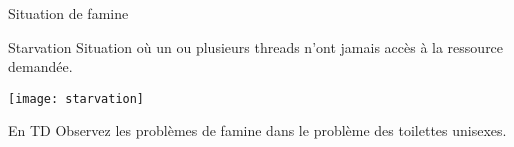 
\begingroup

\begin{frame}{Situation de famine}

  \vFill

  \begin{block}{Starvation}
    Situation où un ou  plusieurs threads n'ont \alert{jamais accès}
    à la ressource demandée.
  \end{block}

  \vFill

  \begin{center}
    \texttt{[image: starvation]}
  \end{center}      

  \vFill

  \begin{alertblock}{En TD}
    Observez les problèmes de famine dans le problème des toilettes unisexes.
  \end{alertblock}

  \vFill

\end{frame}

\endgroup
\endinput

